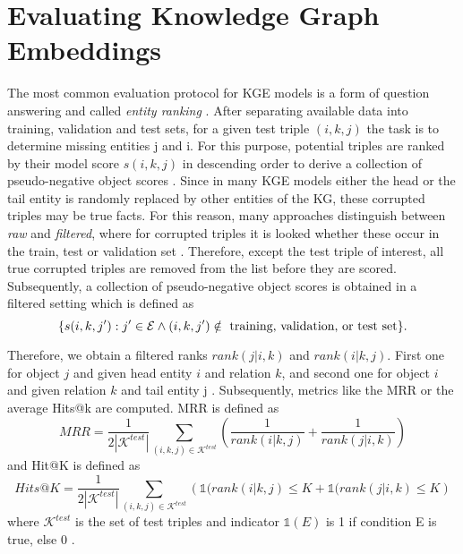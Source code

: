 \section{Evaluating Knowledge Graph Embeddings} 
\label{sec:evaluating_knowledge_graph_embeddings}

The most common evaluation protocol for \ac{KGE} models is a form of question answering and called \textit{entity ranking} \cite{Ruffinelli2020You}.
After separating available data into training, validation and test sets, for a given test triple $(i,k,j)$ the task is to determine missing entities j and i.
For this purpose, potential triples are ranked by their model score $s(i, k, j)$ in descending order to derive a collection of pseudo-negative object scores \cite{Ruffinelli2020You}.
Since in many \ac{KGE} models either the head or the tail entity is randomly replaced by other entities of the \ac{KG}, these corrupted triples may be true facts.
For this reason, many approaches distinguish between \textit{raw} and \textit{filtered}, where for corrupted triples it is looked whether these occur in the train, test or validation set \cite{TransE}.
Therefore, except the test triple of interest, all true corrupted triples are removed from the list before they are scored.
Subsequently, a collection of pseudo-negative object scores is obtained in a filtered setting  which is defined as \cite{Ruffinelli2020You}
$$\{ s(i, k, j') : j' \in \mathcal{E} \wedge (i, k, j') \notin \text{ training, validation, or test set}\}.$$

Therefore, we obtain a filtered ranks $rank(j|i, k)$ and $rank(i|k, j)$.
First one for object $j$ and given head entity $i$ and relation $k$, 
and second one for object $i$ and given relation $k$ and tail entity j \cite{Ruffinelli2020You}.
Subsequently, metrics like the \ac{MRR} or the average Hits@k are computed.
MRR is defined as \cite{Ruffinelli2020You}
\begin{equation}
    MRR = \frac{1}{2 |\mathcal{K}^{test}|} \sum_{(i,k,j) \in  \mathcal{K}^{test}} \left( \frac{1}{rank(i |k,j)} + \frac{1}{rank(j|i,k)} \right)
\end{equation}
and Hit@K is defined as \cite{Ruffinelli2020You}
\begin{equation}
    Hits@K = \frac{1}{2|\mathcal{K}^{test}|} \sum_{(i,k,j) \in  \mathcal{K}^{test}} \left( \mathds{1} (rank(i |k,j) \leq K + \mathds{1}  (rank(j|i,k) \leq K \right)
\end{equation}
where $\mathcal{K}^{test}$ is the set of test triples and indicator $\mathds{1}(E)$ is 1 if condition E is true, else 0 \cite{Ruffinelli2020You}.